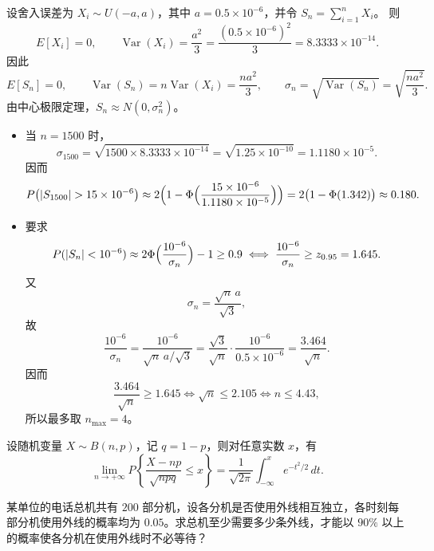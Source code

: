 \begin{solution}
设舍入误差为 $X_i\sim U(-a,a)$，其中 $a=0.5\times 10^{-6}$，并令
$S_n=\sum_{i=1}^n X_i$。
则
\[
E[X_i]=0,\qquad 
\operatorname{Var}(X_i)=\frac{a^2}{3}
=\frac{(0.5\times 10^{-6})^2}{3}
=8.3333\times 10^{-14}.
\]
因此
\[
E[S_n]=0,\qquad 
\operatorname{Var}(S_n)=n\operatorname{Var}(X_i)=\frac{na^2}{3},\qquad
\sigma_n=\sqrt{\operatorname{Var}(S_n)}
=\sqrt{\frac{na^2}{3}}.
\]
由中心极限定理，$S_n\approx N(0,\sigma_n^2)$。

\begin{itemize}
  \item[(1)] 当 $n=1500$ 时，
  \[
  \sigma_{1500}
  =\sqrt{1500\times 8.3333\times 10^{-14}}
  =\sqrt{1.25\times 10^{-10}}
  =1.1180\times 10^{-5}.
  \]
  因而
  \[
  P\big(|S_{1500}|>15\times 10^{-6}\big)
  \approx
  2\Bigl(1-\Phi\Bigl(\frac{15\times 10^{-6}}{1.1180\times 10^{-5}}\Bigr)\Bigr)
  =2\bigl(1-\Phi(1.342)\bigr)\approx 0.180.
  \]

  \item[(2)] 要求
  \[
  P(|S_n|<10^{-6})
  \approx
  2\Phi\Bigl(\frac{10^{-6}}{\sigma_n}\Bigr)-1
  \ge 0.9
  \iff
  \frac{10^{-6}}{\sigma_n}\ge z_{0.95}=1.645.
  \]
  又
  \[
  \sigma_n=\frac{\sqrt{n}\,a}{\sqrt{3}},
  \]
  故
  \[
  \frac{10^{-6}}{\sigma_n}
  =
  \frac{10^{-6}}{\sqrt{n}\,a/\sqrt{3}}
  =
  \frac{\sqrt{3}}{\sqrt{n}}\cdot
  \frac{10^{-6}}{0.5\times 10^{-6}}
  =
  \frac{3.464}{\sqrt{n}}.
  \]
  因而
  \[
  \frac{3.464}{\sqrt{n}}\ge 1.645
  \iff
  \sqrt{n}\le 2.105
  \iff
  n\le 4.43,
  \]
  所以最多取 $n_{\max}=4$。
\end{itemize}
\end{solution}

\begin{theorem}
设随机变量 $X\sim B(n,p)$，记 $q=1-p$，则对任意实数 $x$，有
\[
\lim_{n\to+\infty}
P\!\left\{
\frac{X-np}{\sqrt{npq}}\le x
\right\}
=
\frac{1}{\sqrt{2\pi}}
\int_{-\infty}^{x} e^{-t^{2}/2}\,dt .
\]
\end{theorem}
\begin{homework}[5.15]
某单位的电话总机共有 $200$ 部分机，设各分机是否使用外线相互独立，各时刻每部分机使用外线的概率均为 $0.05$。求总机至少需要多少条外线，才能以 $90\%$ 以上的概率使各分机在使用外线时不必等待？
\end{homework}

